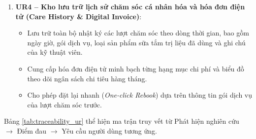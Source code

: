 \begin{enumerate}
    \begin{itemize}
        \item Cung cấp giao diện thanh tiến trình thời gian thực chuẩn hóa qua 4 mốc: \textbf{Mốc 1 (Đã nhận thú cưng)} $\rightarrow$ \textbf{Mốc 2 (Đang chăm sóc)} $\rightarrow$ \textbf{Mốc 3 (Hoàn tất dịch vụ)} $\rightarrow$ \textbf{Mốc 4 (Sẵn sàng chờ đón)}.
        \item Mỗi mốc hiển thị thời gian ghi nhận thực tế và thời gian hoàn tất dự kiến; hỗ trợ gửi thông báo đẩy tự động khi trạng thái chuyển mốc.
        \item Cho phép chủ nuôi xem hình ảnh kiểm tra sức khỏe sơ bộ tại tiệm và gửi dặn dò bổ sung trực tiếp cho kỹ thuật viên trong suốt ca chăm sóc.
    \end{itemize}
    \item \textbf{UR4 -- Kho lưu trữ lịch sử chăm sóc cá nhân hóa và hóa đơn điện tử (Care History \& Digital Invoice)}:
    \begin{itemize}
        \item Lưu trữ toàn bộ nhật ký các lượt chăm sóc theo dòng thời gian, bao gồm ngày giờ, gói dịch vụ, loại sản phẩm sữa tắm trị liệu đã dùng và ghi chú của kỹ thuật viên.
        \item Cung cấp hóa đơn điện tử minh bạch từng hạng mục chi phí và biểu đồ theo dõi ngân sách chi tiêu hàng tháng.
        \item Cho phép đặt lại nhanh (\textit{One-click Rebook}) dựa trên thông tin gói dịch vụ của lượt chăm sóc trước.
    \end{itemize}
\end{enumerate}

Bảng \ref{tab:traceability_ur} thể hiện ma trận truy vết từ Phát hiện nghiên cứu $\rightarrow$ Điểm đau $\rightarrow$ Yêu cầu người dùng tương ứng.

